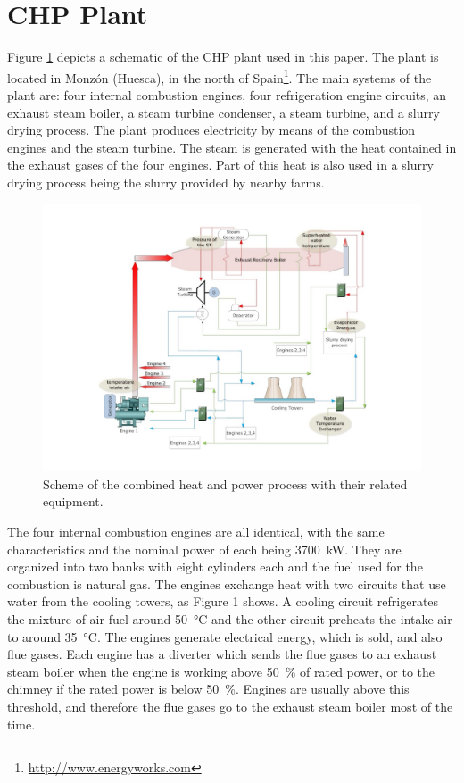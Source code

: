 \section{CHP Plant}
\label{plant}

Figure \ref{figplant} depicts a schematic of the CHP plant used in this paper. The plant is located in Monz\'on (Huesca), in the north of Spain\footnote{\url{http://www.energyworks.com}}. The main systems of the plant are: four internal combustion engines, four refrigeration engine circuits, an exhaust steam boiler, a steam turbine condenser, a steam turbine, and a slurry drying process. The plant produces electricity by means of the combustion engines and the steam turbine. The steam is generated with the heat contained in the exhaust gases of the four engines. Part of this heat is also used in a slurry drying process being the slurry provided by nearby farms.

\begin{figure}
\includegraphics[width=1\textwidth]{plant.pdf}
\caption{Scheme of the combined heat and power process with their related equipment.}
\label{figplant}
\end{figure}

The four internal combustion engines are all identical, with the same characteristics and the nominal power of each being \SI{3700}{kW}. They are organized into two banks with eight cylinders each and the fuel used for the combustion is natural gas. The engines exchange heat with two circuits that use water from the cooling towers, as Figure 1 shows. A cooling circuit refrigerates the mixture of air-fuel around \SI{50}{\celsius} and the other circuit preheats the intake air to around \SI{35}{\celsius}. The engines generate electrical energy, which is sold,  and also flue gases. Each engine has a diverter which sends the flue gases to an exhaust steam boiler when the engine is working above \SI{50}{\percent} of rated power, or to the chimney if the rated power is below \SI{50}{\percent}. Engines are usually above this threshold, and therefore the flue gases go to the exhaust steam boiler most of the time. 

